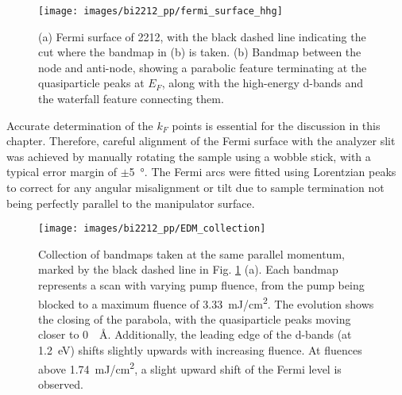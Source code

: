 
\begin{figure}[t]
	\centering
	\texttt{[image: images/bi2212\_pp/fermi\_surface\_hhg]}
	\caption{(a) Fermi surface of 2212, with the black dashed line indicating the cut where the bandmap in (b) is taken. (b) Bandmap between the node and anti-node, showing a parabolic feature terminating at the quasiparticle peaks at $E_F$, along with the high-energy  d-bands and the waterfall feature connecting them.}
	\label{fig:fs_cut}
\end{figure}


Accurate determination of the $k_F$ points is essential for the discussion in this chapter.
Therefore, careful alignment of the Fermi surface with the analyzer slit was achieved by manually rotating the sample using a wobble stick, with a typical error margin of $\pm$\qty{5}{\degree}.
The Fermi arcs were fitted using Lorentzian peaks to correct for any angular misalignment or tilt due to sample termination not being perfectly parallel to the manipulator surface.

\begin{figure}[th!]
	\centering
	\texttt{[image: images/bi2212\_pp/EDM\_collection]}
	\caption{Collection of bandmaps taken at the same parallel momentum, marked by the black dashed line in Fig. \ref{fig:fs_cut} (a). Each bandmap represents a scan with varying pump fluence, from the pump being blocked to a maximum fluence of \qty{3.33}{\milli\joule/\centi\meter\squared}. The evolution shows the closing of the parabola, with the quasiparticle peaks moving closer to \qty{0}{\per\angstrom}. Additionally, the leading edge of the  d-bands (at \qty{1.2}{\electronvolt}) shifts slightly upwards with increasing fluence. At fluences above \qty{1.74}{\milli\joule/\centi\meter\squared}, a slight upward shift of the Fermi level is observed.}
	\label{fig:edm_collection}
\end{figure}

